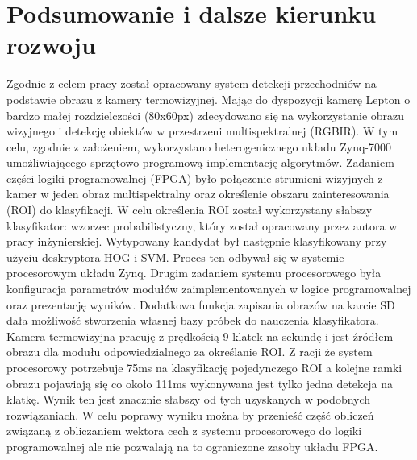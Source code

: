 \chapter{Podsumowanie i dalsze kierunku rozwoju}
Zgodnie z celem pracy został opracowany system detekcji przechodniów na podstawie obrazu z kamery termowizyjnej. Mając do dyspozycji kamerę Lepton o bardzo małej rozdzielczości (80x60px) zdecydowano się na wykorzystanie obrazu wizyjnego i detekcję obiektów w przestrzeni multispektralnej (RGBIR). W tym celu, zgodnie z założeniem, wykorzystano heterogenicznego układu Zynq-7000 umożliwiającego sprzętowo-programową implementację algorytmów. Zadaniem części logiki programowalnej (FPGA) było połączenie strumieni wizyjnych z kamer w jeden obraz multispektralny oraz określenie obszaru zainteresowania (ROI) do klasyfikacji. W celu określenia ROI został wykorzystany słabszy klasyfikator: wzorzec probabilistyczny, który został opracowany przez autora w pracy inżynierskiej. Wytypowany kandydat był następnie klasyfikowany przy użyciu deskryptora HOG i SVM. Proces ten odbywał się w systemie procesorowym układu Zynq. Drugim zadaniem systemu procesorowego była konfiguracja parametrów modułów zaimplementowanych w logice programowalnej oraz prezentację wyników. Dodatkowa funkcja zapisania obrazów na karcie SD dała możliwość stworzenia własnej bazy próbek do nauczenia klasyfikatora. 
Kamera termowizyjna pracuję z prędkością 9 klatek na sekundę i jest źródłem obrazu dla modułu odpowiedzialnego za określanie ROI. Z racji że system procesorowy potrzebuje 75ms na klasyfikację pojedynczego ROI a kolejne ramki obrazu pojawiają się co około 111ms wykonywana jest tylko jedna detekcja na klatkę. Wynik ten jest znacznie słabszy od tych uzyskanych w podobnych rozwiązaniach.  W celu poprawy wyniku można by przenieść część obliczeń związaną z obliczaniem wektora cech z systemu procesorowego do logiki programowalnej ale nie pozwalają na to ograniczone zasoby układu FPGA.
